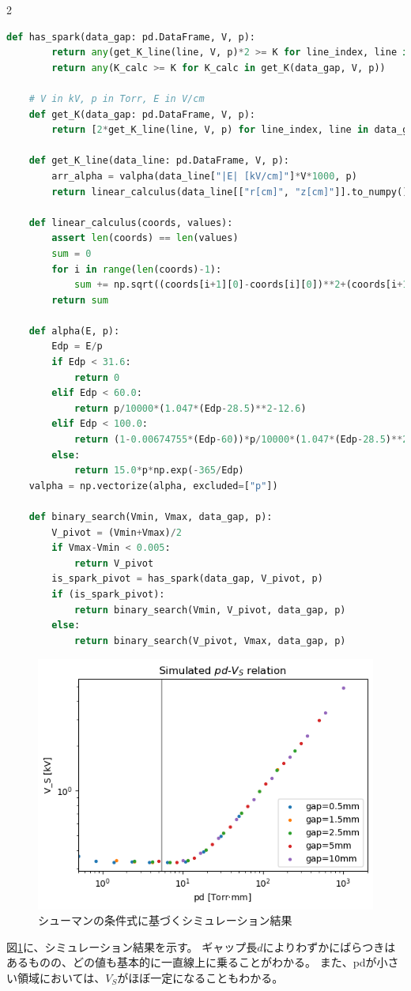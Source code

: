 \documentclass[a4paper]{ltjsarticle}
\begin{document}
\begin{multicols}{2}
    \begin{lstlisting}[language=python, title={二分探索による$V_S$の検証}]
    def has_spark(data_gap: pd.DataFrame, V, p):
        return any(get_K_line(line, V, p)*2 >= K for line_index, line in data_gap.groupby("No."))
        return any(K_calc >= K for K_calc in get_K(data_gap, V, p))
    
    # V in kV, p in Torr, E in V/cm
    def get_K(data_gap: pd.DataFrame, V, p):
        return [2*get_K_line(line, V, p) for line_index, line in data_gap.groupby("No.")]
    
    def get_K_line(data_line: pd.DataFrame, V, p):
        arr_alpha = valpha(data_line["|E| [kV/cm]"]*V*1000, p)
        return linear_calculus(data_line[["r[cm]", "z[cm]"]].to_numpy(), arr_alpha)
        
    def linear_calculus(coords, values):
        assert len(coords) == len(values)
        sum = 0
        for i in range(len(coords)-1):
            sum += np.sqrt((coords[i+1][0]-coords[i][0])**2+(coords[i+1][1]-coords[i][1])**2) * (values[i]+values[i+1])/2
        return sum
    
    def alpha(E, p):
        Edp = E/p
        if Edp < 31.6:
            return 0
        elif Edp < 60.0:
            return p/10000*(1.047*(Edp-28.5)**2-12.6)
        elif Edp < 100.0:
            return (1-0.00674755*(Edp-60))*p/10000*(1.047*(Edp-28.5)**2-12.6)
        else:
            return 15.0*p*np.exp(-365/Edp)
    valpha = np.vectorize(alpha, excluded=["p"])
    
    def binary_search(Vmin, Vmax, data_gap, p):
        V_pivot = (Vmin+Vmax)/2
        if Vmax-Vmin < 0.005:
            return V_pivot
        is_spark_pivot = has_spark(data_gap, V_pivot, p)
        if (is_spark_pivot):
            return binary_search(Vmin, V_pivot, data_gap, p)
        else:
            return binary_search(V_pivot, Vmax, data_gap, p)
    \end{lstlisting}
\end{multicols}
\begin{figure}
    \centering
    \includegraphics[width=0.7\linewidth]{./images/equal_simulated.png}
    \caption{シューマンの条件式に基づくシミュレーション結果}
    \label{fig:equal_simulated}
\end{figure}
図\ref{fig:equal_simulated}に、シミュレーション結果を示す。
ギャップ長$d$によりわずかにばらつきはあるものの、どの値も基本的に一直線上に乗ることがわかる。
また、pdが小さい領域においては、$V_S$がほぼ一定になることもわかる。
\end{document}
